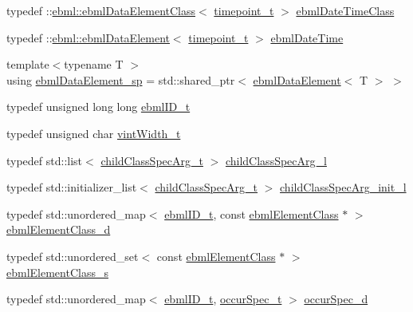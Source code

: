 \begin{DoxyCompactItemize}
\item 
typedef \+::\mbox{\hyperlink{classebml_1_1ebmlDataElementClass}{ebml\+::ebml\+Data\+Element\+Class}}$<$ \mbox{\hyperlink{namespaceebml_a7e667ec3fe8b51fb5b8f9690734d8638}{timepoint\+\_\+t}} $>$ \mbox{\hyperlink{namespaceebml_afea0376d38786592ad3e71d619256ab5}{ebml\+Date\+Time\+Class}}
\item 
typedef \+::\mbox{\hyperlink{classebml_1_1ebmlDataElement}{ebml\+::ebml\+Data\+Element}}$<$ \mbox{\hyperlink{namespaceebml_a7e667ec3fe8b51fb5b8f9690734d8638}{timepoint\+\_\+t}} $>$ \mbox{\hyperlink{namespaceebml_a544c5c28e36511ffd20b5907e551754f}{ebml\+Date\+Time}}
\item 
{\footnotesize template$<$typename T $>$ }\\using \mbox{\hyperlink{namespaceebml_a738c4f024d5a5af45f80985d0456ca6f}{ebml\+Data\+Element\+\_\+sp}} = std\+::shared\+\_\+ptr$<$ \mbox{\hyperlink{classebml_1_1ebmlDataElement}{ebml\+Data\+Element}}$<$ T $>$ $>$
\item 
typedef unsigned long long \mbox{\hyperlink{namespaceebml_a86c5f604ddf12a74aa9812e997a58691}{ebml\+I\+D\+\_\+t}}
\item 
typedef unsigned char \mbox{\hyperlink{namespaceebml_a2ccdfb60b23efb51fe07f9d066e23604}{vint\+Width\+\_\+t}}
\item 
typedef std\+::list$<$ \mbox{\hyperlink{structebml_1_1childClassSpecArg__t}{child\+Class\+Spec\+Arg\+\_\+t}} $>$ \mbox{\hyperlink{namespaceebml_abf07998998c284c9be3f76b5d9e192e1}{child\+Class\+Spec\+Arg\+\_\+l}}
\item 
typedef std\+::initializer\+\_\+list$<$ \mbox{\hyperlink{structebml_1_1childClassSpecArg__t}{child\+Class\+Spec\+Arg\+\_\+t}} $>$ \mbox{\hyperlink{namespaceebml_a40cf7ad4b58caaa8c07da3ed83f7a431}{child\+Class\+Spec\+Arg\+\_\+init\+\_\+l}}
\item 
typedef std\+::unordered\+\_\+map$<$ \mbox{\hyperlink{namespaceebml_a86c5f604ddf12a74aa9812e997a58691}{ebml\+I\+D\+\_\+t}}, const \mbox{\hyperlink{classebml_1_1ebmlElementClass}{ebml\+Element\+Class}} $\ast$ $>$ \mbox{\hyperlink{namespaceebml_a103756ab7f2c1c3c2bbc34334bd9b416}{ebml\+Element\+Class\+\_\+d}}
\item 
typedef std\+::unordered\+\_\+set$<$ const \mbox{\hyperlink{classebml_1_1ebmlElementClass}{ebml\+Element\+Class}} $\ast$ $>$ \mbox{\hyperlink{namespaceebml_a014ea85f559c01fc8f53b63240eecc8a}{ebml\+Element\+Class\+\_\+s}}
\item 
typedef std\+::unordered\+\_\+map$<$ \mbox{\hyperlink{namespaceebml_a86c5f604ddf12a74aa9812e997a58691}{ebml\+I\+D\+\_\+t}}, \mbox{\hyperlink{structebml_1_1occurSpec__t}{occur\+Spec\+\_\+t}} $>$ \mbox{\hyperlink{namespaceebml_a1cd7dafb7e8e8975fecc4a11ef03c5be}{occur\+Spec\+\_\+d}}

\end{DoxyCompactItemize}
